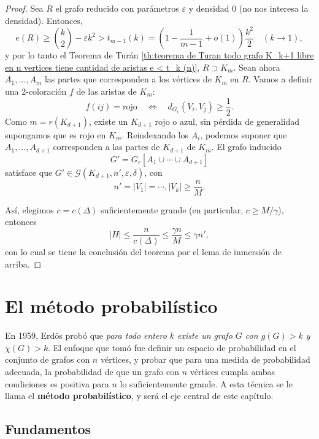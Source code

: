 \documentclass[12pt]{report}
\theoremstyle{plain}
\theoremstyle{definition}
\newcommand{\abs}[1]{\left \vert #1 \right \vert}
\begin{document}
\begin{proof}
Sea $R$ el grafo reducido con parámetros $\varepsilon$ y densidad $0$ (no nos interesa la densidad). Entonces,
\[
    e(R) \geq \binom k 2     - \varepsilon k^2 > t_{m-1} (k) = \left ( 1 - \frac{1}{m-1} + o(1) \right) \frac{k^2}{2}  \quad (k \longrightarrow 1),
\]
y por lo tanto el Teorema de Turán \ref{th:teorema de Turan todo grafo K_k+1 libre en n vertices tiene cantidad de aristas e < t_k (n)}, $R \supset K_m$. Sean ahora $A_1, \ldots, A_m$ las partes que corresponden a los vértices de $K_m$ en $R$. Vamos a definir una $2$-coloración $f$ de las aristas de $K_m$:
\[
    f(ij) = \text{rojo} \quad \Leftrightarrow \quad d_{G_r} (V_i, V_j) \geq \frac{1}{2}.
\]
Como $m = r (K_{d + 1})$, existe un $K_{d + 1}$ rojo o azul, sin pérdida de generalidad supongamos que es rojo en $K_m$. Reindexando los $A_i$, podemos suponer que $A_1, \ldots, A_{d+1}$ corresponden a las partes de $K_{d+1}$ de $K_m$. El grafo inducido
\[
    G' = G_r [A_1 \cup \cdots \cup A_{d+1}]
\]
satisface que $G' \in \mathcal G (K_{d+1}, n', \varepsilon, \delta)$, con
\[
    n' = \abs{V_1} = \cdots, \abs{V_k} \geq \frac{n}{M}.
\]

Así, elegimos $c = c(\Delta)$ suficientemente grande (en particular, $c \geq M/\gamma$), entonces
\[
    \abs H \leq \frac{n}{c(\Delta)} \leq \frac{\gamma n}{M} \leq \gamma n',
\]
con lo cual se tiene la conclusión del teorema por el lema de inmersión de arriba.
\end{proof}







\chapter{El método probabilístico}

En 1959, Erdös probó que \textit{para todo entero $k$ existe un grafo $G$ con $g(G)>k$ y $\chi (G) > k$}. El enfoque que tomó fue definir un espacio de probabilidad en el conjunto de grafos con $n$ vértices, y probar que para una medida de probabilidad adecuada, la probabilidad de que un grafo con $n$ vértices cumpla ambas condiciones es positiva para $n$ lo suficientemente grande. A esta técnica se le llama el \textbf{método probabilístico}, y será el eje central de este capítulo.


\section{Fundamentos}
\end{document}
